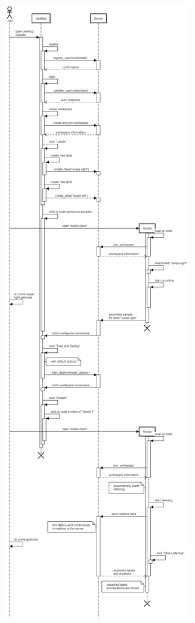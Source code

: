 \begin{center}
    \includegraphics[width=\textwidth,trim={0 0 0 72cm},clip]{charts/sequencefrank.png}
\end{center}

